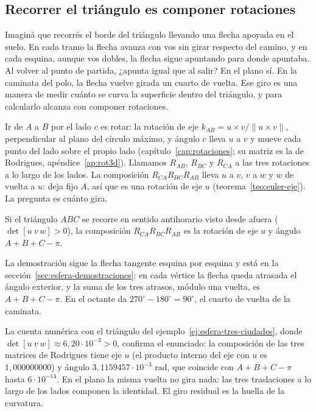 \subsection{Recorrer el triángulo es componer rotaciones}

Imaginá que recorrés el borde del triángulo llevando una flecha apoyada en el suelo. En cada
tramo la flecha avanza con vos sin girar respecto del camino, y en cada esquina, aunque vos
dobles, la flecha sigue apuntando para donde apuntaba. Al volver al punto de partida, ¿apunta
igual que al salir? En el plano sí. En la caminata del polo, la flecha vuelve girada un cuarto
de vuelta. Ese giro es una manera de medir cuánto se curva la superficie dentro del triángulo,
y para calcularlo alcanza con componer rotaciones.

Ir de \(A\) a \(B\) por el lado \(c\) es rotar: la rotación de eje
\(k_{AB}=u\times v/\|u\times v\|\), perpendicular al plano del círculo máximo, y ángulo \(c\)
lleva \(u\) a \(v\) y mueve cada punto del lado sobre el propio lado
(capítulo~\ref{cap:rotaciones}; su matriz es la de Rodrigues, apéndice~\ref{ap:rot3d}).
Llamamos \(R_{AB}\), \(R_{BC}\) y \(R_{CA}\) a las tres rotaciones a lo largo de los lados. La composición \(R_{CA}R_{BC}R_{AB}\) lleva \(u\) a \(v\),
\(v\) a \(w\) y \(w\) de vuelta a \(u\): deja fijo \(A\), así que es una rotación de eje \(u\)
(teorema~\ref{teo:euler-eje}). La pregunta es cuánto gira.

\begin{proposicion}\label{prop:vuelta-exceso}
Si el triángulo \(ABC\) se recorre en sentido antihorario visto desde afuera
(\(\det[u\ v\ w]>0\)), la composición \(R_{CA}R_{BC}R_{AB}\) es la rotación de eje \(u\) y
ángulo \(A+B+C-\pi\).
\end{proposicion}

La demostración sigue la flecha tangente esquina por esquina y está en la
sección~\ref{sec:esfera-demostraciones}: en cada vértice la flecha queda atrasada el ángulo
exterior, y la suma de los tres atrasos, módulo una vuelta, es \(A+B+C-\pi\). En el octante
da \(270^\circ-180^\circ=90^\circ\), el cuarto de vuelta de la caminata.

La cuenta numérica con el triángulo del ejemplo~\ref{ej:esfera-tres-ciudades}, donde
\(\det[u\ v\ w]\approx6{,}20\cdot10^{-3}>0\), confirma el enunciado: la composición de las
tres matrices de Rodrigues tiene eje \(u\) (el producto interno del eje con \(u\) es
\(1{,}000000000\)) y ángulo \(3{,}1159457\cdot10^{-3}\) rad, que coincide con
\(A+B+C-\pi\) hasta \(6\cdot10^{-14}\). En el plano la misma vuelta no gira nada: las tres
traslaciones a lo largo de los lados componen la identidad. El giro residual es la huella de
la curvatura.

